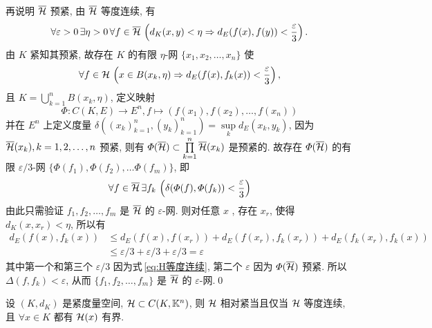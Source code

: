 \begin{Proof}
          再说明 $ \overline{\mathcal{H}} $ 预紧, 由 $ \overline{\mathcal{H}} $ 等度连续, 有
          \begin{equation}\label{eq:H等度连续}
               \forall \varepsilon>0\,\exists\eta>0\,\forall f\in\overline{\mathcal{H}}\,\left(d_{K}(x, y)<\eta\Rightarrow d_{E}(f(x), f(y))<\frac{\varepsilon}{3}\right).
          \end{equation}
          由 $ K $ 紧知其预紧, 故存在 $ K $ 的有限 $ \eta $-网 $ \{ x_{1}, x_{2}, \dots, x_{n} \} $ 使
          \[
               \forall f\in\mathcal{H}\,\left(x\in B(x_{k}, \eta)\Rightarrow d_{E}(f(x), f_{k}(x))<\frac{\varepsilon}{3}\right),
          \]
          且 $ K=\bigcup_{k=1}^{n}B(x_{k}, \eta) $, 定义映射
          \[
               \varPhi: C(K, E)\to E^{n}, f\mapsto (f(x_{1}), f(x_{2}), \dots, f(x_{n}))     
          \]
          并在 $ E^{n} $ 上定义度量 $ \delta((x_{k})_{k=1}^{n}, (y_{k})_{k=1}^{n})=\sup\limits_{k} d_{E}(x_{k}, y_{k}) $, 因为 $ \overline{\mathcal{H}}(x_{k}), k=1, 2, \dots, n $ 预紧, 则有 $ \varPhi(\overline{\mathcal{H}})\subset\prod\limits_{k=1}^{n}\overline{\mathcal{H}}(x_{k}) $ 是预紧的. 故存在 $ \varPhi(\overline{\mathcal{H}}) $ 的有限 $ \varepsilon/3 $-网 $ \{ \varPhi(f_{1}),\varPhi(f_{2}),\dots \varPhi(f_{m}) \} $, 即
          \[
               \forall f\in\overline{\mathcal{H}}\,\exists f_{k}\,\left(\delta(\varPhi(f), \varPhi(f_{k}))<\frac{\varepsilon}{3}\right)
          \] 
          由此只需验证 $ f_{1}, f_{2},\dots,f_{m}  $ 是 $ \overline{\mathcal{H}} $ 的 $ \varepsilon $-网. 则对任意 $ x $ , 存在 $ x_{r} $, 使得 $ d_{K}(x, x_{r})<\eta $, 所以有
          \[
               \begin{aligned}
                    d_{E}(f(x), f_{k}(x)) & \leqslant d_{E}(f(x), f(x_{r}))+ d_{E}(f(x_{r}), f_{k}(x_{r}))+d_{E}(f_{k}(x_{r}), f_{k}(x))\\
                    & \leqslant \varepsilon/3+\varepsilon/3+\varepsilon/3=\varepsilon
               \end{aligned}
          \]
          其中第一个和第三个 $ \varepsilon/3 $ 因为式\,\eqref{eq:H等度连续}, 第二个 $ \varepsilon $ 因为 $ \varPhi(\overline{\mathcal{H}}) $ 预紧. 所以 $ \varDelta(f, f_{k})<\varepsilon $, 从而 $ \{f_{1}, f_{2}, \dots , f_{m}\} $ 是 $ \overline{\mathcal{H}} $ 的 $ \varepsilon $-网.\qed
     \end{Proof}

     \begin{Corollary}
          设 $ (K, d_{K}) $ 是紧度量空间, $ \mathcal{H}\subset C(K, \mathbb{K}^{n}) $, 则 $ \mathcal{H} $ 相对紧当且仅当 $ \mathcal{H} $ 等度连续, 且 $ \forall x\in K $ 都有 $ \mathcal{H}(x) $ 有界.
     \end{Corollary}

